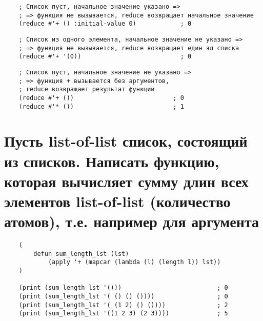 \begin{lstlisting}
    ; Список пуст, начальное значение указано =>
    ; => функция не вызывается, reduce возвращает начальное значение 
    (reduce #'+ () :initial-value 0)            ; 0
\end{lstlisting}
\begin{lstlisting}
    ; Список из одного элемента, начальное значение не указано =>
    ; => функция не вызывается, reduce возвращает един эл списка
    (reduce #'+ '(0))                           ; 0
\end{lstlisting}
\begin{lstlisting}
    ; Список пуст, начальное значение не указано =>
    ; => функция + вызывается без аргументов, 
    ; reduce возвращает результат функции     
    (reduce #'+ ())                           ; 0
    (reduce #'* ())                           ; 1
\end{lstlisting}

\section{Пусть list-of-list список, состоящий из списков. Написать функцию, которая вычисляет сумму длин всех элементов list-of-list (количество атомов), т.е. например для аргумента}

\begin{lstlisting}
    (
        defun sum_length_lst (lst)
            (apply '+ (mapcar (lambda (l) (length l)) lst))
    )
    
    (print (sum_length_lst '()))                          ; 0
    (print (sum_length_lst '( () () ())))                 ; 0
    (print (sum_length_lst '( (1 2) () ())))              ; 2
    (print (sum_length_lst '((1 2 3) (2 3))))             ; 5
\end{lstlisting}